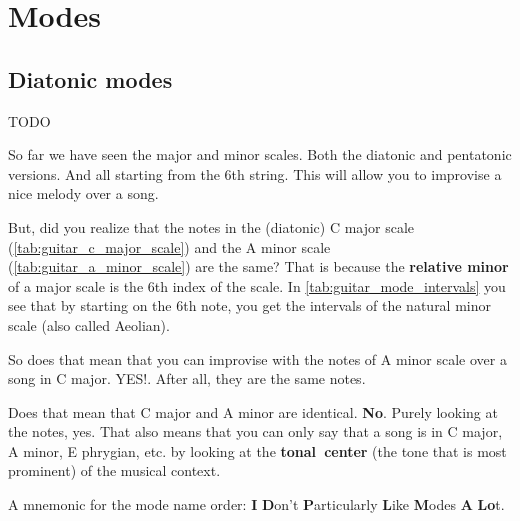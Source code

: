 \section{Modes}

\subsection{Diatonic modes}

TODO

\iffalse
So far we have seen the major and minor scales. Both the diatonic and pentatonic versions. And all starting from the 6th string. This will allow you to improvise a nice melody over a song.

But, did you realize that the notes in the (diatonic) C major scale (\autoref{tab:guitar_c_major_scale}) and the A minor scale (\autoref{tab:guitar_a_minor_scale}) are the same? That is because the \textbf{relative minor} of a major scale is the 6th index of the scale. In \autoref{tab:guitar_mode_intervals} you see that by starting on the 6th note, you get the intervals of the natural minor scale (also called Aeolian).

So does that mean that you can improvise with the notes of A minor scale over a song in C major. YES!. After all, they are the same notes.

Does that mean that C major and A minor are identical. \textbf{No}. Purely looking at the notes, yes. That also means that you can only say that a song is in C major, A minor, E phrygian, etc. by looking at the \mbox{\textbf{tonal center}} (the tone that is most prominent) of the musical context. 

A mnemonic for the mode name order: \textbf{I} \textbf{D}on't \textbf{P}articularly \textbf{L}ike \textbf{M}odes \textbf{A} \textbf{Lo}t.

